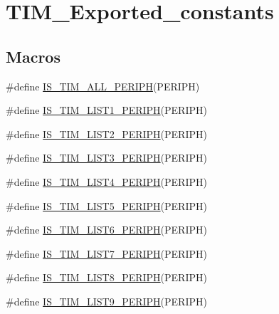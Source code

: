 \hypertarget{group___t_i_m___exported__constants}{}\section{T\+I\+M\+\_\+\+Exported\+\_\+constants}
\label{group___t_i_m___exported__constants}
\subsection*{Macros}
\begin{DoxyCompactItemize}
\item 
\#define \mbox{\hyperlink{group___t_i_m___exported__constants_ga71710da28a59c007a1d2ddee18a5ffcc}{I\+S\+\_\+\+T\+I\+M\+\_\+\+A\+L\+L\+\_\+\+P\+E\+R\+I\+PH}}(P\+E\+R\+I\+PH)
\item 
\#define \mbox{\hyperlink{group___t_i_m___exported__constants_ga1abea04e3837b7683d8e8dc33441677f}{I\+S\+\_\+\+T\+I\+M\+\_\+\+L\+I\+S\+T1\+\_\+\+P\+E\+R\+I\+PH}}(P\+E\+R\+I\+PH)
\item 
\#define \mbox{\hyperlink{group___t_i_m___exported__constants_ga3c489ac3294f0d8f2ec097da909bc8e0}{I\+S\+\_\+\+T\+I\+M\+\_\+\+L\+I\+S\+T2\+\_\+\+P\+E\+R\+I\+PH}}(P\+E\+R\+I\+PH)
\item 
\#define \mbox{\hyperlink{group___t_i_m___exported__constants_ga2d80541c542755ac3f2aca078bd98adb}{I\+S\+\_\+\+T\+I\+M\+\_\+\+L\+I\+S\+T3\+\_\+\+P\+E\+R\+I\+PH}}(P\+E\+R\+I\+PH)
\item 
\#define \mbox{\hyperlink{group___t_i_m___exported__constants_ga9c2699fd3d0c0901f8ac706c3d2dfe10}{I\+S\+\_\+\+T\+I\+M\+\_\+\+L\+I\+S\+T4\+\_\+\+P\+E\+R\+I\+PH}}(P\+E\+R\+I\+PH)
\item 
\#define \mbox{\hyperlink{group___t_i_m___exported__constants_ga90232c3966a578fbd9be2b228f225cb4}{I\+S\+\_\+\+T\+I\+M\+\_\+\+L\+I\+S\+T5\+\_\+\+P\+E\+R\+I\+PH}}(P\+E\+R\+I\+PH)
\item 
\#define \mbox{\hyperlink{group___t_i_m___exported__constants_ga99fabffbddc9ca930f80a4480daeecbe}{I\+S\+\_\+\+T\+I\+M\+\_\+\+L\+I\+S\+T6\+\_\+\+P\+E\+R\+I\+PH}}(P\+E\+R\+I\+PH)
\item 
\#define \mbox{\hyperlink{group___t_i_m___exported__constants_ga421bba71d6e8fbe9a9d422ecd59e79be}{I\+S\+\_\+\+T\+I\+M\+\_\+\+L\+I\+S\+T7\+\_\+\+P\+E\+R\+I\+PH}}(P\+E\+R\+I\+PH)
\item 
\#define \mbox{\hyperlink{group___t_i_m___exported__constants_ga120d98895bd48d628028753212b68233}{I\+S\+\_\+\+T\+I\+M\+\_\+\+L\+I\+S\+T8\+\_\+\+P\+E\+R\+I\+PH}}(P\+E\+R\+I\+PH)
\item 
\#define \mbox{\hyperlink{group___t_i_m___exported__constants_ga24ff46311f2d074ec6bd93f2972d1d9b}{I\+S\+\_\+\+T\+I\+M\+\_\+\+L\+I\+S\+T9\+\_\+\+P\+E\+R\+I\+PH}}(P\+E\+R\+I\+PH)
\end{DoxyCompactItemize}


